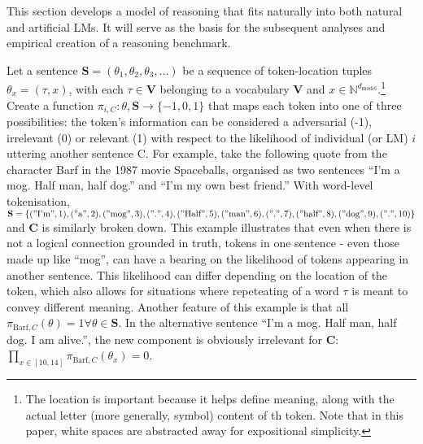 \documentclass[
]{article}
\begin{document}
This section develops a model of reasoning that fits naturally into both
natural and artificial LMs. It will serve as the basis for the
subsequent analyses and empirical creation of a reasoning benchmark.

Let a sentence \(\mathbf{S} = (\theta_1, \theta_2, \theta_3, ...)\) be a
sequence of token-location tuples \(\theta_x = (\tau, x)\), with each
\(\tau \in \mathbf{V}\) belonging to a vocabulary \(\mathbf{V}\) and
\(x \in \mathbb{N}^{d_{\text{model}}}\).\footnote{The location is
  important because it helps define meaning, along with the actual
  letter (more generally, symbol) content of th token. Note that in this
  paper, white spaces are abstracted away for expositional simplicity.}
Create a function \(\pi_{i, C} : \theta, \mathbf{S} \to \{-1, 0, 1\}\)
that maps each token into one of three possibilities: the token's
information can be considered a adversarial (-1), irrelevant (0) or
relevant (1) with respect to the likelihood of individual (or LM) \(i\)
uttering another sentence C. For example, take the following quote from
the character Barf in the 1987 movie Spaceballs, organised as two
sentences ``I'm a mog. Half man, half dog.'' and ``I'm my own best
friend.'' With word-level tokenisation,
\(\mathbf{S} = \{("\text{I'm}", 1), ("\text{a}", 2), ("\text{mog}", 3), ("\text{.}", 4), ("\text{Half}", 5), ("\text{man}", 6), ("\text{,}", 7), ("\text{half}", 8), ("\text{dog}", 9), ("\text{.}", 10)\}\)
and \(\mathbf{C}\) is similarly broken down. This example illustrates
that even when there is not a logical connection grounded in truth,
tokens in one sentence - even those made up like ``mog'', can have a
bearing on the likelihood of tokens appearing in another sentence. This
likelihood can differ depending on the location of the token, which also
allows for situations where repeteating of a word \(\tau\) is meant to
convey different meaning. Another feature of this example is that all
\(\pi_{\text{Barf}, C}(\theta) = 1 \forall \theta \in \mathbf{S}\). In
the alternative sentence ``I'm a mog. Half man, half dog. I am alive.'',
the new component is obviously irrelevant for \(\mathbf{C}\):
\(\prod_{x \in [10, 14]} \pi_{\text{Barf}, C}(\theta_x) = 0\).
\end{document}
